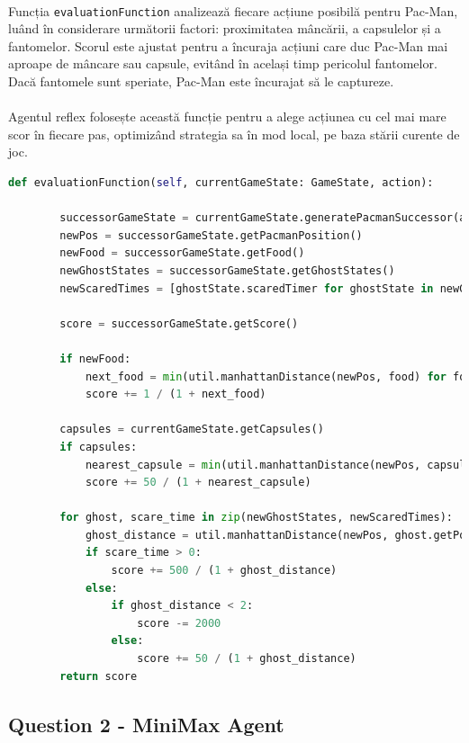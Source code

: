 \documentclass[12pt]{article}
\begin{document}
	\paragraph{}Funcția \texttt{evaluationFunction} analizează fiecare acțiune posibilă pentru Pac-Man, luând în considerare următorii factori: proximitatea mâncării, a capsulelor și a fantomelor. Scorul este ajustat pentru a încuraja acțiuni care duc Pac-Man mai aproape de mâncare sau capsule, evitând în același timp pericolul fantomelor. Dacă fantomele sunt speriate, Pac-Man este încurajat să le captureze. \paragraph{}Agentul reflex folosește această funcție pentru a alege acțiunea cu cel mai mare scor în fiecare pas, optimizând strategia sa în mod local, pe baza stării curente de joc.
	\begin{lstlisting}[language=Python]
    def evaluationFunction(self, currentGameState: GameState, action):

        successorGameState = currentGameState.generatePacmanSuccessor(action)
        newPos = successorGameState.getPacmanPosition()
        newFood = successorGameState.getFood()
        newGhostStates = successorGameState.getGhostStates()
        newScaredTimes = [ghostState.scaredTimer for ghostState in newGhostStates]

        score = successorGameState.getScore()

        if newFood:
            next_food = min(util.manhattanDistance(newPos, food) for food in newFood)
            score += 1 / (1 + next_food)

        capsules = currentGameState.getCapsules()
        if capsules:
            nearest_capsule = min(util.manhattanDistance(newPos, capsule) for capsule in capsules)
            score += 50 / (1 + nearest_capsule)

        for ghost, scare_time in zip(newGhostStates, newScaredTimes):
            ghost_distance = util.manhattanDistance(newPos, ghost.getPosition())
            if scare_time > 0:
                score += 500 / (1 + ghost_distance)
            else:
                if ghost_distance < 2:
                    score -= 2000
                else:
                    score += 50 / (1 + ghost_distance)
        return score
    \end{lstlisting}
\newpage
	\subsection{Question 2 - MiniMax Agent}
\end{document}

